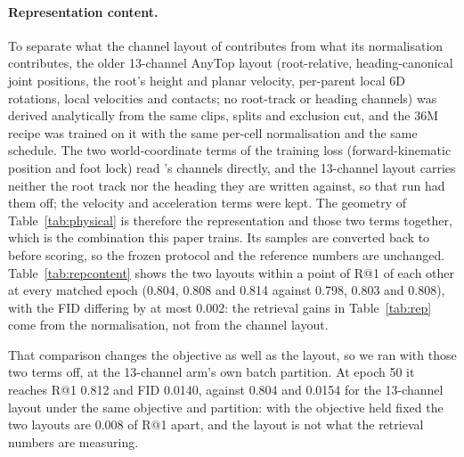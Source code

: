 \paragraph{Representation content.} To separate what the channel layout of \rep{} contributes from
what its normalisation contributes, the older 13-channel AnyTop layout (root-relative, heading-canonical
joint positions, the root's height and planar velocity, per-parent local 6D rotations, local velocities
and contacts; no root-track or heading channels) was derived analytically from the same clips, splits
and exclusion cut, and the \num{36}M recipe was trained on it with the same per-cell normalisation and
the same schedule. The two world-coordinate terms of the training loss (forward-kinematic position and
foot lock) read \rep{}'s channels directly, and the 13-channel layout carries neither the root track nor the
heading they are written against, so that run had them off; the velocity and acceleration terms were kept.
The geometry of Table~\ref{tab:physical} is therefore the representation and those two terms together, which is
the combination this paper trains. Its samples are converted back
to \rep{} before scoring, so the frozen protocol and the reference numbers are unchanged.
Table~\ref{tab:repcontent} shows the two layouts within a point of R@1 of each other at every matched
epoch (\num{0.804}, \num{0.808} and \num{0.814} against \num{0.798}, \num{0.803} and \num{0.808}),
with the FID differing by at most \num{0.002}: the retrieval gains in Table~\ref{tab:rep} come from the
normalisation, not from the channel layout.

That comparison changes the objective as well as the layout, so we ran \rep{} with those two terms off,
at the 13-channel arm's own batch partition. At epoch 50 it reaches R@1 \num{0.812} and FID
\num{0.0140}, against \num{0.804} and \num{0.0154} for the 13-channel layout under the same objective
and partition: with the objective held fixed the two layouts are \num{0.008} of R@1 apart, and the
layout is not what the retrieval numbers are measuring.

